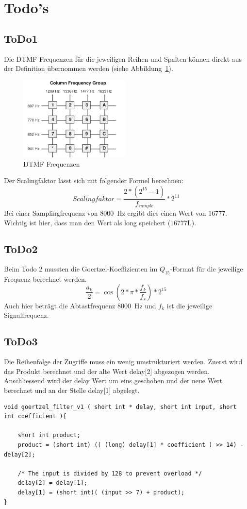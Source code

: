 \documentclass[a4paper,11pt]{article}
\begin{document}
\section{Todo's}
\subsection{ToDo1}
Die DTMF Frequenzen für die jeweiligen Reihen und Spalten können direkt aus der Definition übernommen werden (siehe Abbildung~\ref{fig:DTMF_freq}).
\begin{figure}[h!]
\centering
\includegraphics[width=0.5\textwidth]{DTMF_freq}
\caption{DTMF Frequenzen}
\label{fig:DTMF_freq}
\end{figure}
\newline
Der Scalingfaktor lässt sich mit folgender Formel berechnen:
\begin{equation}\label{eq:Scalingfakt}
	Scalingfaktor = \frac{2*(2^{15}-1)}{f_{sample}}*2^{11}
\end{equation}
Bei einer Samplingfrequenz von \SI{8000}{\hertz} ergibt dies einen Wert von 16777. Wichtig ist hier, dass man den Wert als long speichert (16777L). 

\subsection{ToDo2}
Beim Todo 2 mussten die Goertzel-Koeffizienten im $Q_{15}$-Format für die jeweilige Frequenz berechnet werden.
\begin{equation}\label{eq:Goertzel_Koeff}
	\frac{a_k}{2}= \cos(2*\pi*\frac{f_k}{f_s})*2^{15}
\end{equation}
Auch hier beträgt die Abtastfrequenz \SI{8000}{\hertz} und $f_k$ ist die jeweilige Signalfrequenz.

\subsection{ToDo3}
Die Reihenfolge der Zugriffe muss ein wenig umstrukturiert werden. Zuerst wird das Produkt berechnet und der alte Wert delay[2] abgezogen werden. Anschliessend wird der delay Wert um eins geschoben und der neue Wert berechnet und an der Stelle delay[1] abgelegt. 
\begin{lstlisting}
void goertzel_filter_v1 ( short int * delay, short int input, short int coefficient ){
	
	short int product;
	product = (short int) (( (long) delay[1] * coefficient ) >> 14) - delay[2];

	/* The input is divided by 128 to prevent overload */
	delay[2] = delay[1];
	delay[1] = (short int)( (input >> 7) + product);
}
\end{lstlisting}
\end{document}

